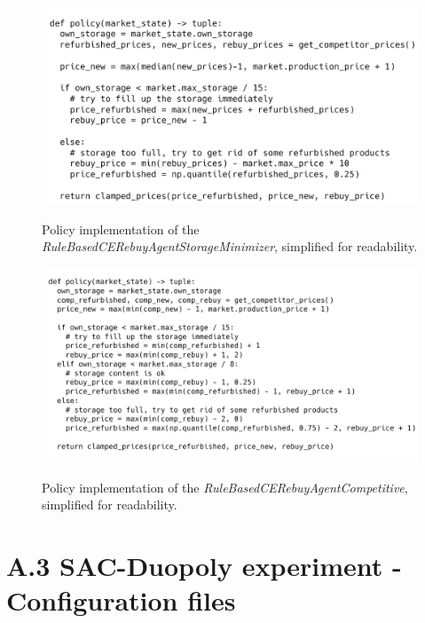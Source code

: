 \begin{figure}[ht]
	\includegraphics[width = \textwidth]{images/policies/RuleBasedCERebuyAgentStorageMinimizerPolicy.png}\\
	\caption{Policy implementation of the \emph{RuleBasedCERebuyAgentStorageMinimizer}, simplified for readability.}\label{fig:PolicyRuleBasedStorageMinimizer}
\end{figure}

\begin{figure}[!]
	\includegraphics[width = \textwidth]{images/policies/RuleBasedCERebuyAgentCompetitivePolicy.png}\\
	\caption{Policy implementation of the \emph{RuleBasedCERebuyAgentCompetitive}, simplified for readability.}\label{fig:PolicyRuleBasedCompetitive}
\end{figure}

\clearpage
\section*{A.3 SAC-Duopoly experiment - Configuration files}


